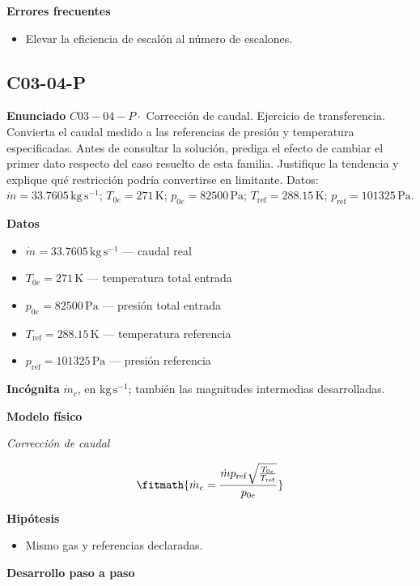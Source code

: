 \documentclass[10pt,openany]{book}
\begin{document}
\noindent\textbf{Errores frecuentes}
\begin{itemize}
\item Elevar la eficiencia de escalón al número de escalones.
\end{itemize}
\subsection*{C03-04-P}

\noindent\textbf{Enunciado}
\(C03-04-P \cdot\) Corrección de caudal. Ejercicio de transferencia. Convierta el caudal medido a las referencias de presión y temperatura especificadas. Antes de consultar la solución, prediga el efecto de cambiar el primer dato respecto del caso resuelto de esta familia. Justifique la tendencia y explique qué restricción podría convertirse en limitante. Datos: \(\dot m=33.7605\, \mathrm{kg}\,\mathrm{s}^{-1}\); \(T_{0e}=271\, \mathrm{K}\); \(p_{0e}=82500\, \mathrm{Pa}\); \(T_{\mathrm{ref}}=288.15\, \mathrm{K}\); \(p_{\mathrm{ref}}=101325\, \mathrm{Pa}\).

\noindent\textbf{Datos}
\begin{itemize}
\item $\dot m = 33.7605\,\mathrm{kg}\,\mathrm{s}^{-1}$ — caudal real
\item $T_{0e} = 271\,\mathrm{K}$ — temperatura total entrada
\item $p_{0e} = 82500\,\mathrm{Pa}$ — presión total entrada
\item $T_{\mathrm{ref}} = 288.15\,\mathrm{K}$ — temperatura referencia
\item $p_{\mathrm{ref}} = 101325\,\mathrm{Pa}$ — presión referencia
\end{itemize}

\noindent\textbf{Incógnita}
$\dot{m}_c$, en $\mathrm{kg\,s^{-1}}$; también las magnitudes intermedias desarrolladas.

\noindent\textbf{Modelo físico}

\noindent\textit{Corrección de caudal}

\[
\fitmath{\dot{m}_c=\frac{\dot m p_{\mathrm{ref}} \sqrt{\frac{T_{0e}}{T_{\mathrm{ref}}}}}{p_{0e}}}
\]

\noindent\textbf{Hipótesis}
\begin{itemize}
\item Mismo gas y referencias declaradas.
\end{itemize}

\noindent\textbf{Desarrollo paso a paso}
\end{document}
